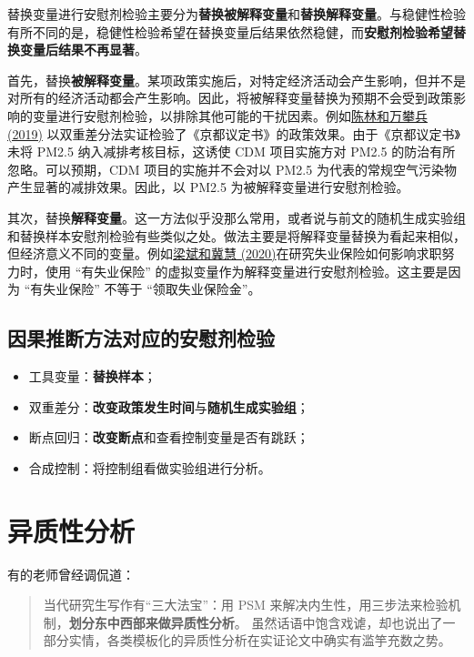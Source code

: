 \documentclass[11pt,a4paper]{ctexart}
\begin{document}
替换变量进行安慰剂检验主要分为\textbf{替换被解释变量}和\textbf{替换解释变量}。与稳健性检验有所不同的是，稳健性检验希望在替换变量后结果依然稳健，而\textbf{安慰剂检验希望替换变量后结果不再显著}。

首先，替换\textbf{被解释变量}。某项政策实施后，对特定经济活动会产生影响，但并不是对所有的经济活动都会产生影响。因此，将被解释变量替换为预期不会受到政策影响的变量进行安慰剂检验，以排除其他可能的干扰因素。例如\href{https://kns.cnki.net/kcms/detail/detail.aspx?dbcode=CJFD&dbname=CJFDLAST2019&filename=JJYJ201903005&v=ffsbFCXZ\%mmd2BXF9CfTznsO8xoxakDNmvBFcTMUs8359w9IdicgoEyHeOCDsCUnOpPBW}{陈林和万攀兵
(2019)}
以双重差分法实证检验了《京都议定书》的政策效果。由于《京都议定书》未将
PM2.5 纳入减排考核目标，这诱使 CDM 项目实施方对 PM2.5
的防治有所忽略。可以预期，CDM 项目的实施并不会对以 PM2.5
为代表的常规空气污染物产生显著的减排效果。因此，以 PM2.5
为被解释变量进行安慰剂检验。

其次，替换\textbf{解释变量}。这一方法似乎没那么常用，或者说与前文的随机生成实验组和替换样本安慰剂检验有些类似之处。做法主要是将解释变量替换为看起来相似，但经济意义不同的变量。例如\href{https://kns.cnki.net/kcms/detail/detail.aspx?dbcode=CJFD&dbname=CJFDLAST2020&filename=JJYJ202003015&v=x7X5dmdiedPFs539QYL5K7oc4hqEGfbh3pGl0jw1UVFXZ\%mmd2FmMCWon6QkUvE8NO\%mmd2BoE}{梁斌和冀慧
(2020)}在研究失业保险如何影响求职努力时，使用 ``有失业保险''
的虚拟变量作为解释变量进行安慰剂检验。这主要是因为 ``有失业保险'' 不等于
``领取失业保险金''。

\subsection{因果推断方法对应的安慰剂检验}

\begin{itemize}
\item
  工具变量：\textbf{替换样本}；
\item
  双重差分：\textbf{改变政策发生时间}与\textbf{随机生成实验组}；
\item
  断点回归：\textbf{改变断点}和查看控制变量是否有跳跃；
\item
  合成控制：将控制组看做实验组进行分析。
\end{itemize}

\section{异质性分析}

有的老师曾经调侃道：

\begin{quote}
当代研究生写作有``三大法宝''：用 PSM
来解决内生性，用三步法来检验机制，\textbf{划分东中西部来做异质性分析}。
虽然话语中饱含戏谑，却也说出了一部分实情，各类模板化的异质性分析在实证论文中确实有滥竽充数之势。
\end{quote}
\end{document}
